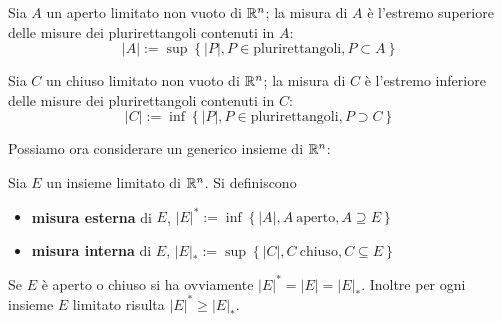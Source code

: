 \begin{defn}
Sia $A$ un aperto limitato non vuoto di $\mathbb{R}^n$; la misura di $A$ è l'estremo superiore delle misure dei plurirettangoli contenuti in $A$:
\begin{equation*}
|A| := \sup \left\{|P|, P\in \text{plurirettangoli}, P\subset A\right\}
\end{equation*}
\end{defn}

\begin{defn}
Sia $C$ un chiuso limitato non vuoto di $\mathbb{R}^n$; la misura di $C$ è l'estremo inferiore delle misure dei plurirettangoli contenuti in $C$:
\begin{equation*}
| C| := \inf\left\{| P|, P\in \text{plurirettangoli}, P\supset C\right\}
\end{equation*}
\end{defn}

Possiamo ora considerare un generico insieme di $\mathbb{R}^n$:
\begin{defn}
Sia $E$ un insieme limitato di $\mathbb{R}^n$. Si definiscono
\begin{itemize}
\item \textbf{misura esterna} di $E$, $| E|^{*} := \inf\left\{| A|, A\ \text{aperto}, A\supseteq E\right\}$
\item \textbf{misura interna} di $E$, $| E|_{*} := \sup \left\{| C|, C\ \text{chiuso}, C\subseteq E\right\}$
\end{itemize}
\end{defn}

\begin{rem}
Se $E$ è aperto o chiuso si ha ovviamente $| E|^{*}=|E|=| E|_{*}$. Inoltre per ogni insieme $E$ limitato risulta $| E|^{*}\geq | E|_{*}$.
\end{rem}

